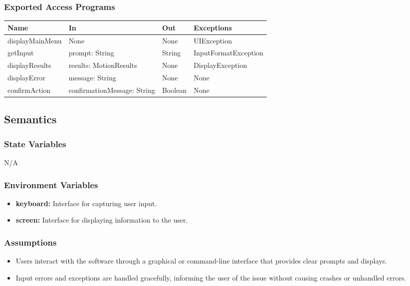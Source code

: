 \documentclass[12pt, titlepage]{article}
\begin{document}
\subsubsection{Exported Access Programs}

\begin{center}
\begin{tabular}{p{4cm} p{4cm} p{3cm} p{5cm}}
\hline
\textbf{Name} & \textbf{In} & \textbf{Out} & \textbf{Exceptions} \\
\hline
displayMainMenu & None & None & UIException \\
getInput & prompt: String & String & InputFormatException \\
displayResults & results: MotionResults & None & DisplayException \\
displayError & message: String & None & None \\
confirmAction & confirmationMessage: String & Boolean & None \\
\hline
\end{tabular}
\end{center}

\subsection{Semantics}

\subsubsection{State Variables}
N/A

\subsubsection{Environment Variables}
\begin{itemize}
  \item \textbf{keyboard:} Interface for capturing user input.
  \item \textbf{screen:} Interface for displaying information to the user.
\end{itemize}

\subsubsection{Assumptions}

\begin{itemize}
  \item Users interact with the software through a graphical or command-line interface that provides clear prompts and displays.
  \item Input errors and exceptions are handled gracefully, informing the user of the issue without causing crashes or unhandled errors.
\end{itemize}
\end{document}
